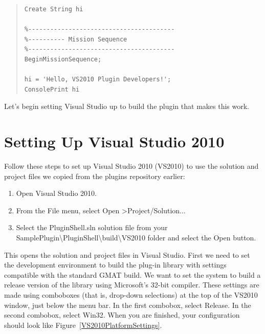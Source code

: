 \documentclass[10pt,letterpaper]{article}
\begin{document}
\begin{quote}
\begin{verbatim}
Create String hi

%----------------------------------------
%---------- Mission Sequence
%----------------------------------------
BeginMissionSequence;

hi = 'Hello, VS2010 Plugin Developers!';
ConsolePrint hi
\end{verbatim}
\end{quote}

\noindent Let's begin setting Visual Studio up to build the plugin that makes this work.

\section{Setting Up Visual Studio 2010}

Follow these steps to set up Visual Studio 2010 (VS2010) to use the solution and project files we copied from the plugins repository earlier:

\begin{enumerate}
\item Open Visual Studio 2010.
\item From the File menu, select Open \textgreater Project/Solution...
\item Select the PluginShell.sln solution file from your SamplePlugin{\textbackslash}PluginShell{\textbackslash}build{\textbackslash}VS2010 folder and select the Open button.  
\setcounter{saveenum}{\value{enumi}}
\end{enumerate}

\noindent This opens the solution and project files in Visual Studio.  First we need to set the development environment to build the plug-in library with settings compatible with the standard GMAT build.  We want to set the system to build a release version of the library using Microsoft's 32-bit compiler.  These settings are made using comboboxes (that is, drop-down selections) at the top of the VS2010 window, just below the menu bar.  In the first combobox, select Release.  In the second combobox, select Win32.  When you are finished, your configuration should look like Figure~\ref{VS2010PlatformSettings}.
\end{document}
